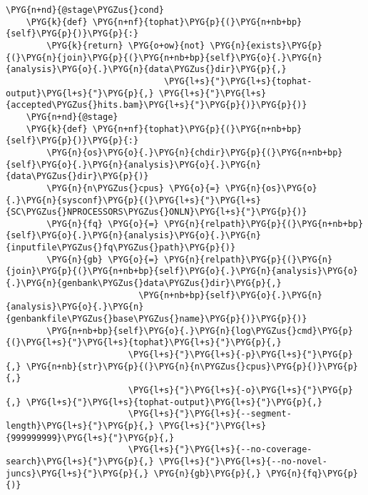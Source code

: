\begin{Verbatim}[commandchars=\\\{\}]
    \PYG{n+nd}{@stage\PYGZus{}cond}
    \PYG{k}{def} \PYG{n+nf}{tophat}\PYG{p}{(}\PYG{n+nb+bp}{self}\PYG{p}{)}\PYG{p}{:}
        \PYG{k}{return} \PYG{o+ow}{not} \PYG{n}{exists}\PYG{p}{(}\PYG{n}{join}\PYG{p}{(}\PYG{n+nb+bp}{self}\PYG{o}{.}\PYG{n}{analysis}\PYG{o}{.}\PYG{n}{data\PYGZus{}dir}\PYG{p}{,}
                               \PYG{l+s}{"}\PYG{l+s}{tophat-output}\PYG{l+s}{"}\PYG{p}{,} \PYG{l+s}{"}\PYG{l+s}{accepted\PYGZus{}hits.bam}\PYG{l+s}{"}\PYG{p}{)}\PYG{p}{)}
    \PYG{n+nd}{@stage}
    \PYG{k}{def} \PYG{n+nf}{tophat}\PYG{p}{(}\PYG{n+nb+bp}{self}\PYG{p}{)}\PYG{p}{:}
        \PYG{n}{os}\PYG{o}{.}\PYG{n}{chdir}\PYG{p}{(}\PYG{n+nb+bp}{self}\PYG{o}{.}\PYG{n}{analysis}\PYG{o}{.}\PYG{n}{data\PYGZus{}dir}\PYG{p}{)}
        \PYG{n}{n\PYGZus{}cpus} \PYG{o}{=} \PYG{n}{os}\PYG{o}{.}\PYG{n}{sysconf}\PYG{p}{(}\PYG{l+s}{"}\PYG{l+s}{SC\PYGZus{}NPROCESSORS\PYGZus{}ONLN}\PYG{l+s}{"}\PYG{p}{)}
        \PYG{n}{fq} \PYG{o}{=} \PYG{n}{relpath}\PYG{p}{(}\PYG{n+nb+bp}{self}\PYG{o}{.}\PYG{n}{analysis}\PYG{o}{.}\PYG{n}{inputfile\PYGZus{}fq\PYGZus{}path}\PYG{p}{)}
        \PYG{n}{gb} \PYG{o}{=} \PYG{n}{relpath}\PYG{p}{(}\PYG{n}{join}\PYG{p}{(}\PYG{n+nb+bp}{self}\PYG{o}{.}\PYG{n}{analysis}\PYG{o}{.}\PYG{n}{genbank\PYGZus{}data\PYGZus{}dir}\PYG{p}{,}
                          \PYG{n+nb+bp}{self}\PYG{o}{.}\PYG{n}{analysis}\PYG{o}{.}\PYG{n}{genbankfile\PYGZus{}base\PYGZus{}name}\PYG{p}{)}\PYG{p}{)}
        \PYG{n+nb+bp}{self}\PYG{o}{.}\PYG{n}{log\PYGZus{}cmd}\PYG{p}{(}\PYG{l+s}{"}\PYG{l+s}{tophat}\PYG{l+s}{"}\PYG{p}{,}
                        \PYG{l+s}{"}\PYG{l+s}{-p}\PYG{l+s}{"}\PYG{p}{,} \PYG{n+nb}{str}\PYG{p}{(}\PYG{n}{n\PYGZus{}cpus}\PYG{p}{)}\PYG{p}{,}
                        \PYG{l+s}{"}\PYG{l+s}{-o}\PYG{l+s}{"}\PYG{p}{,} \PYG{l+s}{"}\PYG{l+s}{tophat-output}\PYG{l+s}{"}\PYG{p}{,}
                        \PYG{l+s}{"}\PYG{l+s}{--segment-length}\PYG{l+s}{"}\PYG{p}{,} \PYG{l+s}{"}\PYG{l+s}{999999999}\PYG{l+s}{"}\PYG{p}{,}
                        \PYG{l+s}{"}\PYG{l+s}{--no-coverage-search}\PYG{l+s}{"}\PYG{p}{,} \PYG{l+s}{"}\PYG{l+s}{--no-novel-juncs}\PYG{l+s}{"}\PYG{p}{,} \PYG{n}{gb}\PYG{p}{,} \PYG{n}{fq}\PYG{p}{)}


\end{Verbatim}
